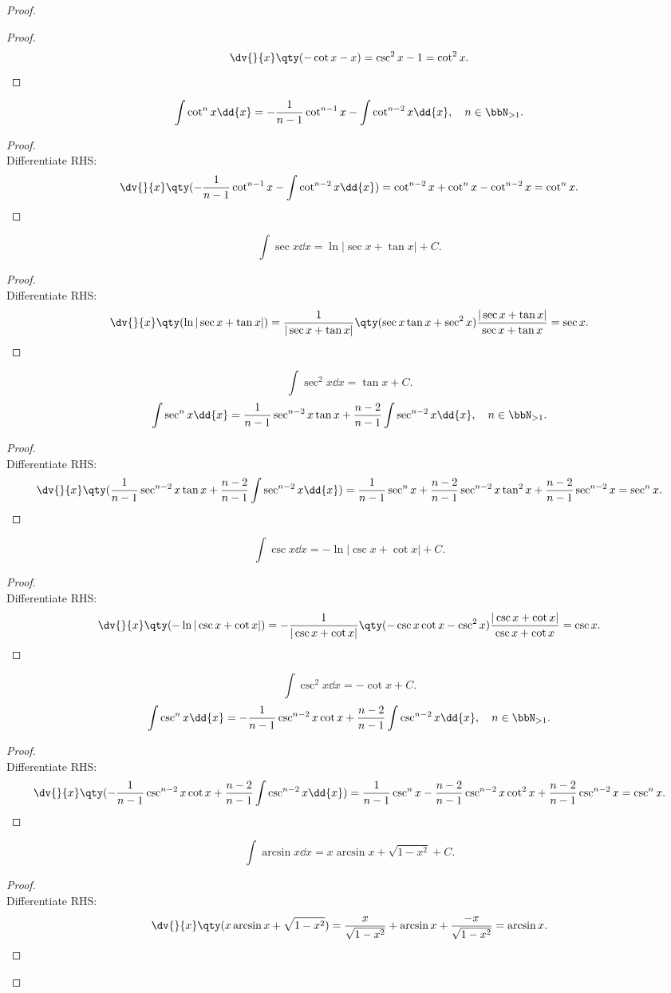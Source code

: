 \documentclass[a4paper,12pt]{report}
\begin{document}
\begin{itemize}
\begin{itemize}
\begin{proof}
\begin{proof}
    \[\dv{}{x}\qty(-\cot x-x)=\csc^2 x-1=\cot^2x.\]
\end{proof}
\[\int\cot^n x\dd{x}=-\frac{1}{n-1}\cot^{n-1}x-\int\cot^{n-2}x\dd{x},\quad n\in\bbN_{>1}.\]
\begin{proof}\mbox{}\\
    Differentiate RHS:
    \[\dv{}{x}\qty(-\frac{1}{n-1}\cot^{n-1}x-\int\cot^{n-2}x\dd{x})=\cot^{n-2}x+\cot^nx-\cot^{n-2}x=\cot^n x.\]
\end{proof}
\[\int\sec x\dd{x}=\ln|\sec x+\tan x|+C.\]
\begin{proof}\mbox{}\\
    Differentiate RHS:
    \[\dv{}{x}\qty(\ln|\sec x+\tan x|)=\frac{1}{|\sec x+\tan x|}\qty(\sec x\tan x+\sec^2 x)\frac{|\sec x+\tan x|}{\sec x+\tan x}=\sec x.\]
\end{proof}
\[\int\sec^2 x\dd{x}=\tan x+C.\]
\[\int\sec^n x\dd{x}=\frac{1}{n-1}\sec^{n-2}x\tan x+\frac{n-2}{n-1}\int\sec^{n-2}x\dd{x},\quad n\in\bbN_{>1}.\]
\begin{proof}\mbox{}\\
    Differentiate RHS:
    \[\dv{}{x}\qty(\frac{1}{n-1}\sec^{n-2}x\tan x+\frac{n-2}{n-1}\int\sec^{n-2}x\dd{x})=\frac{1}{n-1}\sec^nx+\frac{n-2}{n-1}\sec^{n-2}x\tan^2x+\frac{n-2}{n-1}\sec^{n-2}x=\sec^n x.\]
\end{proof}
\[\int\csc x\dd{x}=-\ln|\csc x+\cot x|+C.\]
\begin{proof}\mbox{}\\
    Differentiate RHS:
    \[\dv{}{x}\qty(-\ln|\csc x+\cot x|)=-\frac{1}{|\csc x+\cot x|}\qty(-\csc x\cot x-\csc^2 x)\frac{|\csc x+\cot x|}{\csc x+\cot x}=\csc x.\]
\end{proof}
\[\int\csc^2 x\dd{x}=-\cot x+C.\]
\[\int\csc^n x\dd{x}=-\frac{1}{n-1}\csc^{n-2}x\cot x+\frac{n-2}{n-1}\int\csc^{n-2}x\dd{x},\quad n\in\bbN_{>1}.\]
\begin{proof}\mbox{}\\
    Differentiate RHS:
    \[\dv{}{x}\qty(-\frac{1}{n-1}\csc^{n-2}x\cot x+\frac{n-2}{n-1}\int\csc^{n-2}x\dd{x})=\frac{1}{n-1}\csc^nx-\frac{n-2}{n-1}\csc^{n-2}x\cot^2x+\frac{n-2}{n-1}\csc^{n-2}x=\csc^nx.\]
\end{proof}
\[\int\arcsin x\dd{x}=x\arcsin x+\sqrt{1-x^2}+C.\]
\begin{proof}\mbox{}\\
    Differentiate RHS:
    \[\dv{}{x}\qty(x\arcsin x+\sqrt{1-x^2})=\frac{x}{\sqrt{1-x^2}}+\arcsin x+\frac{-x}{\sqrt{1-x^2}}=\arcsin x.\]
\end{proof}

\end{proof}
\end{itemize}
\end{itemize}
\end{document}
